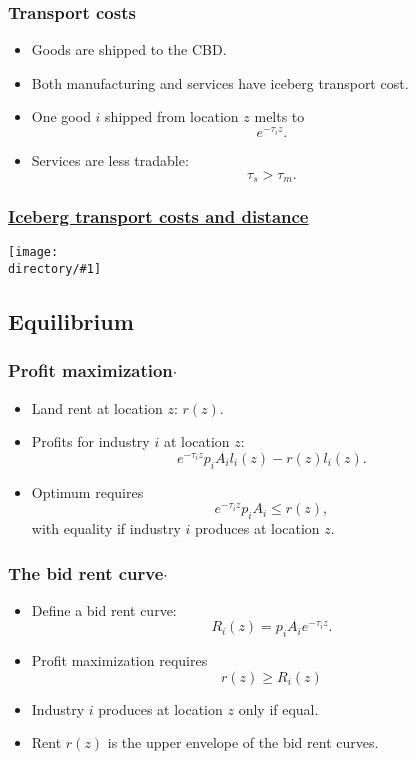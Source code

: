 \documentclass[compress,mathserif]{beamer}
\newcounter{perc}
\newcounter{percek}
\newcommand{\directory}{figures}
\newcommand{\widefigure}[2]{\begin{frame}\frametitle{\hyperlink{#1back}{#2}}\hypertarget{#1}{{\begin{center}\texttt{[image: \\directory/\#1]}\end{center}}}\end{frame}}
\renewcommand{\time}[1]{\addtocounter{percek}{#1}}
\begin{document}
\begin{frame}\frametitle{Transport costs}
\begin{itemize}
    \item Goods are shipped to the CBD.
    \item Both manufacturing and services have iceberg transport cost.
    \item One good $i$ shipped from location $z$ melts to
    \[
    {e}^{-\tau_iz}.
    \]
    \item Services are less tradable:
    \[
    \tau_s>\tau_m.
    \]
\end{itemize}
\end{frame}
\time{2}

\widefigure{Dz-exp}{Iceberg transport costs and distance}

\subsection{Equilibrium}

\begin{frame}\frametitle{Profit maximization$\cdot$}
\begin{itemize}
    \item Land rent at location $z$: $r(z)$.
    \item Profits for industry $i$ at location $z$:
    \[
    {e}^{-\tau_i z} p_i A_i l_i(z) - r(z)l_i(z).
    \]
    \item Optimum requires
    \[
    {e}^{-\tau_i z} p_i A_i \le r(z),
    \]
    with equality if industry $i$ produces at location $z$.
\end{itemize}
\end{frame}
\time{1}

\begin{frame}\frametitle{The bid rent curve$\cdot$}
\begin{itemize}
    \item Define a bid rent curve:
    \[
    R_i(z) = p_iA_i{e}^{-\tau_i z}.
    \]
    \item Profit maximization requires
    \[
    r(z)\ge R_i(z)
    \]
    \item Industry $i$ produces at location $z$ only if equal.
    \item Rent $r(z)$ is the upper envelope of the bid rent curves.
\end{itemize}
\end{frame}
\end{document}

